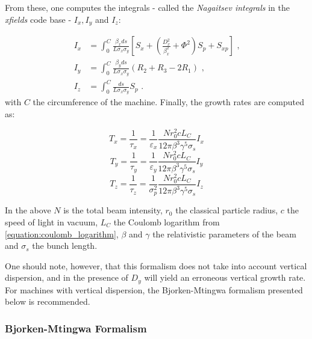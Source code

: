 From these, one computes the integrals - called the \textit{Nagaitsev integrals} in the \textit{xfields} code base - \(I_x, I_y\) and \(I_z\):

\begin{equation}
    \begin{aligned}
        I_x &= \int_0^C \frac{\beta_x ds}{L \sigma_x \sigma_y} \left[S_x + \left( \frac{D_x^{2}}{\beta_x^{2}} + \Phi^{2} \right) S_p + S_{xp} \right] \text{ ,} \\
        I_y &= \int_0^C \frac{\beta_y ds}{L \sigma_x \sigma_y} \left(R_2 + R_3 - 2 R_1\right) \text{ ,} \\
        I_z &= \int_0^C \frac{ds}{L \sigma_x \sigma_y} S_p \text{ .}
    \end{aligned}
    \label{equation:nagaitsev_integrals}
\end{equation}
with \(C\) the circumference of the machine.
Finally, the growth rates are computed as:

\begin{equation}
    \boxed{T_x = \frac{1}{\tau_x} = \frac{1}{\varepsilon_x} \frac{N r_0^{2} c L_C}{12 \pi \beta^3 \gamma^5 \sigma_s} I_x}
\end{equation}
\begin{equation}
    \boxed{T_y = \frac{1}{\tau_y} = \frac{1}{\varepsilon_y} \frac{N r_0^{2} c L_C}{12 \pi \beta^3 \gamma^5 \sigma_s} I_y}
\end{equation}
\begin{equation}
    \boxed{T_z = \frac{1}{\tau_z} = \frac{1}{\sigma_p^{2}} \frac{N r_0^{2} c L_C}{12 \pi \beta^3 \gamma^5 \sigma_s} I_z}
\end{equation}

In the above \(N\) is the total beam intensity, \(r_0\) the classical particle radius, \(c\) the speed of light in vacuum, \(L_C\) the Coulomb logarithm from \eqref{equation:coulomb_logarithm}, \(\beta\) and \(\gamma\) the relativistic parameters of the beam and \(\sigma_s\) the bunch length.
\newline

One should note, however, that this formalism does not take into account vertical dispersion, and in the presence of \(D_y\) will yield an erroneous vertical growth rate.
For machines with vertical dispersion, the Bjorken-Mtingwa formalism presented below is recommended.

\subsubsection{Bjorken-Mtingwa Formalism}

